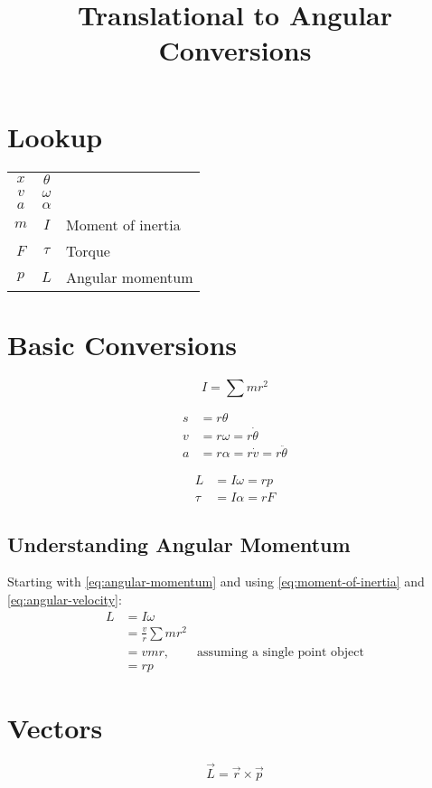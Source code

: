 \documentclass{article}
\title{Translational to Angular Conversions}
\begin{document}
    \maketitle

    \section{Lookup}
    
    \begin{table}[h]
        \centering
        \begin{tabular}{c|cl}
            $x$ & $\theta$ \\
            $v$ & $\omega$ \\
            $a$ & $\alpha$ \\
            $m$ & $I$ & Moment of inertia \\
            $F$ & $\tau$ & Torque \\
            $p$ & $L$ & Angular momentum \\
        \end{tabular}
    \end{table}
    
    \section{Basic Conversions}

    \begin{equation}
        \label{eq:moment-of-inertia}
        I = \sum{mr^2}
    \end{equation}

    \begin{align}
        s &= r\theta \\
        \label{eq:angular-velocity}
        v &= r\omega = r\dot{\theta} \\
        a &= r\alpha = r\dot{v} = r\ddot{\theta}
    \end{align}
    
    \begin{align}
        \label{eq:angular-momentum}
        L &= I\omega = rp \\
        \tau &= I\alpha = rF
    \end{align}

    \subsection{Understanding Angular Momentum}
    Starting with \autoref{eq:angular-momentum} and using \autoref{eq:moment-of-inertia} and \autoref{eq:angular-velocity}: $$\begin{aligned}
        L &= I\omega \\
        &= \frac{v}{r}\sum{mr^2} \\
        &= vmr, & \text{assuming a single point object} \\
        &= rp
    \end{aligned}$$

    \section{Vectors}

    \begin{equation}
        \vec{L} = \vec{r} \times \vec{p}
    \end{equation}
\end{document}
